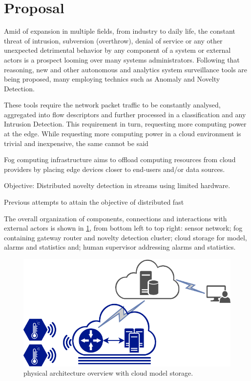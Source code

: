 
\section{Proposal}
\label{sec:prop}

Amid of \iot expansion in multiple fields, from industry to daily life,
the constant threat of intrusion, subversion (overthrow), denial of service
or any other unexpected detrimental behavior by any component of a system or
external actors is a prospect looming over many systems administrators.
Following that reasoning, new \nids and other autonomous and analytics system
surveillance tools are being proposed, many employing technics such as Anomaly
and Novelty Detection.

These tools require the network packet traffic to be constantly analysed,
aggregated into flow descriptors and further processed in a classification
and any Intrusion Detection.
This requirement in turn, requesting more computing power at the edge.
While requesting more computing power in a cloud environment is trivial and
inexpensive, the same cannot be said 

\begin{highlight}
Fog computing infrastructure aims to offload
computing resources from cloud providers by placing edge
devices closer to end-users and/or data sources.

Objective: Distributed novelty detection in streams using limited hardware.

Previous attempts to attain the objective of distributed fast
\end{highlight}

The overall organization of components, connections and interactions with external
actors is shown in \ref{fig:mfog-phy-arch-cloud},
from bottom left to top right: sensor network; fog containing gateway router
and novelty detection cluster; cloud storage for model, alarms and statistics
and; human supervisor addressing alarms and statistics.

\begin{figure}[hbt]
  \centering
  \includegraphics[width=0.9\linewidth,page=1]{figures/mfog-arch-fisica.svg.pdf}
  \caption{\mfog physical architecture overview with cloud model storage.}
  \label{fig:mfog-phy-arch-cloud}
\end{figure}


